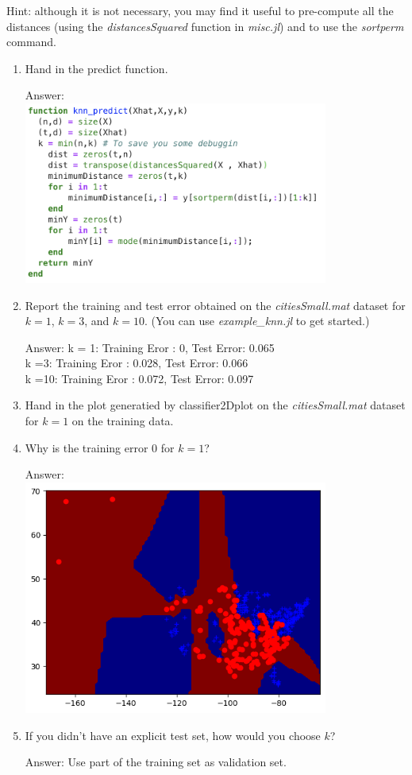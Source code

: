 \documentclass{article}
\def\ans#1{\par\gre{Answer: #1}}
\def\blu#1{{\color{blu}#1}}
\def\gre#1{{\color{gre}#1}}
\def\enum#1{\begin{enumerate}#1\end{enumerate}}
\begin{document}
Hint: although it is not necessary, you may find it useful to pre-compute all the distances (using the \emph{distancesSquared} function in \emph{misc.jl}) and to use the \emph{sortperm} command.
\blu{
\enum{
\item Hand in the predict function. \ans{\\\includegraphics[width = 10cm]{Q3Predict.png}}
\item Report  the training and test error obtained on the \emph{citiesSmall.mat} dataset for $k=1$, $k=3$, and $k=10$. (You can use \emph{example\_knn.jl} to get started.) \ans{k = 1: Training Eror : 0, Test Error: 0.065 \\ k =3: Training Eror : 0.028, Test Error: 0.066 \\ k =10: Training Eror : 0.072, Test Error: 0.097  }
\item Hand in the plot generatied by {classifier2Dplot} on the \emph{citiesSmall.mat} dataset for $k=1$ on the training data. \item Why is the training error $0$ for $k=1$? \ans{\\ \includegraphics[width=10cm]{Q3KnnPredictionGraph.png}}
\item If you didn't have an explicit test set, how would you choose $k$? \ans{Use part of the training set as validation set.}
}
}
\end{document}
